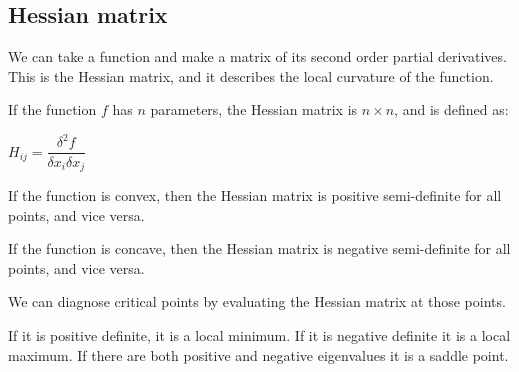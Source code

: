 
\subsection{Hessian matrix}

We can take a function and make a matrix of its second order partial derivatives.  This is the Hessian matrix, and it describes the local curvature of the function.

If the function \(f\) has \(n\) parameters, the Hessian matrix is \(n\times n\), and is defined as:

\(H_{ij}=\dfrac{\delta^2 f}{\delta x_i \delta x_j}\)

If the function is convex, then the Hessian matrix is positive semi-definite for all points, and vice versa.

If the function is concave, then the Hessian matrix is negative semi-definite for all points, and vice versa.

We can diagnose critical points by evaluating the Hessian matrix at those points.

If it is positive definite, it is a local minimum. If it is negative definite it is a local maximum. If there are both positive and negative eigenvalues it is a saddle point.

